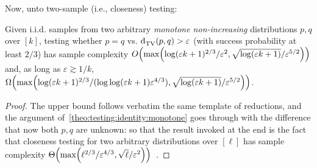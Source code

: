\documentclass[11pt]{article}
\newcommand{\dst}{\varepsilon}
\newcommand{\ab}{k}
\newcommand{\p}{p}
\newcommand{\q}{q}
\begin{document}
Now, unto two-sample (i.e., closeness) testing:
\begin{theorem}\label{theo:testing:identity:monotone}
  Given i.i.d. samples from two arbitrary \emph{monotone non-increasing} distributions $\p,\q$ over $[\ab]$, testing whether $\p=\q$ vs. $\totalvardist{\p}{\q} > \dst$ (with success probability at least $2/3$) has sample complexity $\bigO{\max\mleft( \log(\dst\ab + 1)^{2/3}/\dst^{2}, \sqrt{\log(\dst\ab + 1)}/\dst^{5/2} \mright)}$ and, as long as $\dst \gtrsim 1/\ab$, $\bigOmega{\max\mleft( \log(\dst\ab + 1)^{2/3}/(\log\log(\dst\ab + 1)\dst^{4/3}), \sqrt{\log(\dst\ab + 1)}/\dst^{5/2} \mright)}$.
\end{theorem}
\begin{proof}
The upper bound follows verbatim the same template of reductions, and the argument of~\autoref{theo:testing:identity:monotone} goes through with the difference that now both $\p,\q$ are unknown: so that the result invoked at the end is the fact that closeness testing for two arbitrary distributions over $[\ell]$ has sample complexity $\bigTheta{\max\mleft( \ell^{2/3}/\dst^{4/3}, \sqrt{\ell}/\dst^{2} \mright)}$~\cite{CDVV:14}.


\end{proof}
\end{document}
